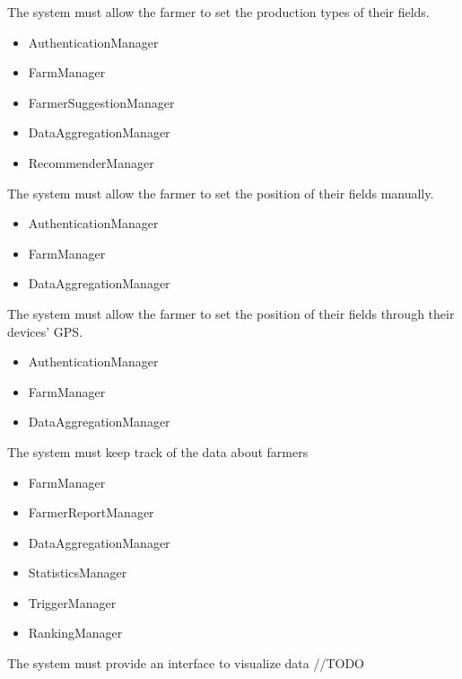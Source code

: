 \begin{itemize}
 The system must allow the farmer to set the production types of their fields.

\begin{itemize}

\item AuthenticationManager
\item FarmManager
\item FarmerSuggestionManager
\item DataAggregationManager
\item RecommenderManager
\end{itemize}

 The system must allow the farmer to set the position of their fields manually.
\begin{itemize}

\item AuthenticationManager
\item FarmManager
\item DataAggregationManager

\end{itemize}
 The system must allow the farmer to set the position of their fields through their devices' GPS.
\begin{itemize}

\item AuthenticationManager
\item FarmManager
\item DataAggregationManager
\end{itemize}

 The system must keep track of the data about farmers
\begin{itemize}


\item FarmManager
\item FarmerReportManager
\item DataAggregationManager
\item StatisticsManager
\item TriggerManager
\item RankingManager

\end{itemize}
 The system must provide an interface to visualize data //TODO
\begin{itemize}


\end{itemize}
\end{itemize}
